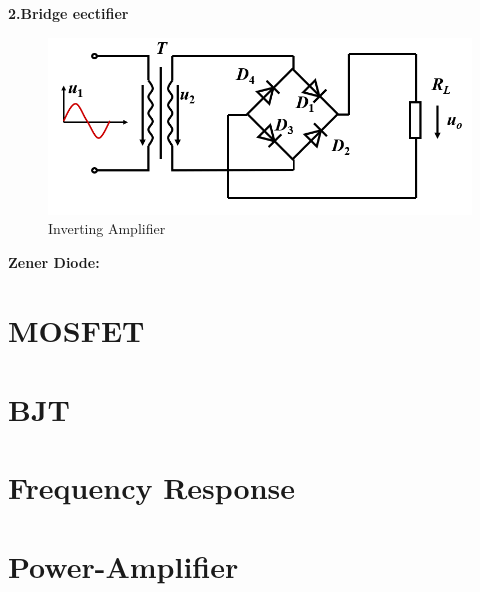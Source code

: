\documentclass[a4paper,11pt,UTF8]{article}
\begin{document}
\textbf{\quad2.Bridge eectifier}
\begin{figure}[H] 
	\centering 
	\includegraphics[scale=0.4]{./img/2.3}
	\caption{Inverting Amplifier}
\end{figure}
\textbf{Zener Diode:}
\section{MOSFET}

\section{BJT}

\section{Frequency Response}

\section{Power-Amplifier}
\end{document}
